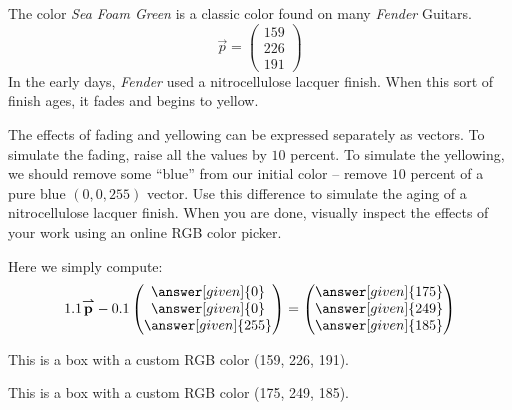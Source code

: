 \documentclass{ximera}
\begin{document}
\begin{example}
  The color \textit{Sea Foam Green} is a classic color found on many \textit{Fender} Guitars.
  \[
  \vec{p} =
  \begin{pmatrix}
    159 \\ 226 \\ 191
  \end{pmatrix}
  \]
  In the early days, \textit{Fender} used a nitrocellulose lacquer
  finish. When this sort of finish ages, it fades and begins to
  yellow.

  The effects of fading and yellowing can be expressed separately as
  vectors. To simulate the fading, raise all the values by $10$
  percent. To simulate the yellowing, we should remove some ``blue'' from
  our initial color -- remove $10$ percent of a pure blue $(0,0,255)$
  vector. Use this difference to simulate the aging of a
  nitrocellulose lacquer finish. When you are done, visually inspect
  the effects of your work using an online RGB color picker.
  \begin{explanation}
    Here we simply compute:
    \[
    1.1 \vec{p} - 0.1  \begin{pmatrix} \answer[given]{0} \\  \answer[given]{0} \\  \answer[given]{255} \end{pmatrix}
    = \begin{pmatrix} \answer[given]{175} \\  \answer[given]{249} \\  \answer[given]{185} \end{pmatrix}
    \]
    \colorbox[rgb]{0.624, 0.886, 0.749}{%
  \parbox{\dimexpr\linewidth-2\fboxsep\relax}{%
    This is a box with a custom RGB color (159, 226, 191).
    }}

    \colorbox[rgb]{0.686, 0.976, 0.725}{%
  \parbox{\dimexpr\linewidth-2\fboxsep\relax}{%
    This is a box with a custom RGB color (175, 249, 185).
    }}
  \end{explanation}
\end{example}
\end{document}
